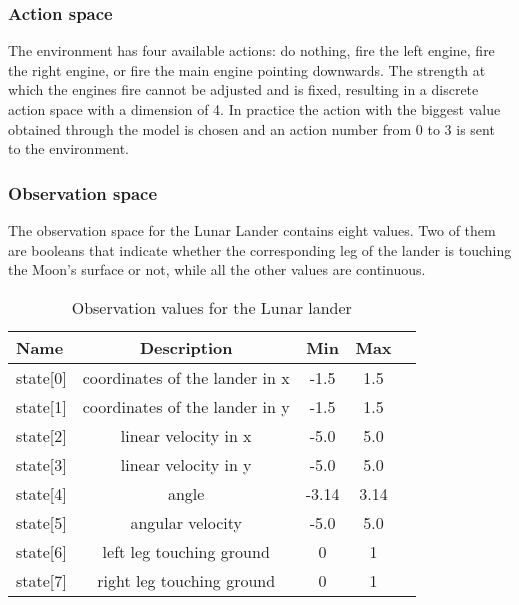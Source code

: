 \subsubsection{Action space}
The environment has four available actions: do nothing, fire the left engine, fire the right engine, or fire the main engine pointing downwards. The strength at which the engines fire cannot be adjusted and is fixed, resulting in a discrete action space with a dimension of 4. In practice the action with the biggest value obtained through the model is chosen and an action number from 0 to 3 is sent to the environment.

\subsubsection{Observation space}
The observation space for the Lunar Lander contains eight values.
Two of them are booleans that indicate whether the corresponding leg of the lander is touching the Moon's surface or not, while all the other values are continuous.

\begin{table}[!ht]
\centering
\caption{Observation values for the Lunar lander}
\begin{tabular}[t]{lcccc}
\toprule
Name & Description & Min & Max \\
\midrule
state[0]& coordinates of the lander in x & -1.5  & 1.5  \\
state[1]& coordinates of the lander in y & -1.5  & 1.5  \\
state[2]& linear velocity in x           & -5.0  & 5.0  \\
state[3]& linear velocity in y           & -5.0  & 5.0  \\
state[4]& angle                          & -3.14 & 3.14 \\
state[5]& angular velocity               & -5.0  & 5.0  \\
state[6]& left leg touching ground       & 0     & 1    \\
state[7]& right leg touching ground      & 0     & 1    \\
\bottomrule
\end{tabular}
\end{table}%

